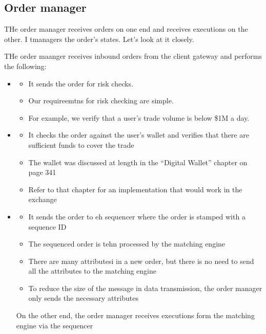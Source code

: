 \documentclass{report}
\theoremstyle{definition}
\let\oldsubsection\subsection
\renewcommand{\subsection}{\oldsubsection*}
\begin{document}
\subsection{Order manager}

THe order manager receives orders on one end and receives executions on the other. I tmanagers the order's states. Let's look at it closely.

THe order maanger receives inbound orders from the client gateway and performs the following:

\begin{itemize}
\item

\begin{itemize}
\item
It sends the order for risk checks.
\item
Our requireemtns for risk checking are simple.
\item
For example, we verify that a user's trade volume is below \$1M a day.
\end{itemize}
\item

\begin{itemize}
\item
It checks the order against the user's wallet and verifies that there are sufficient funds to cover the trade
\item
The wallet was discussed at length in the ``Digital Wallet'' chapter on page 341
\item
Refer to that chapter for an implementation that would work in the exchange
\end{itemize}
\item

\begin{itemize}
\item
It sends the order to eh sequencer where the order is stamped with a sequence ID
\item
The sequenced order is tehn processed by the matching engine
\item
There are many attributesi in a new order, but there is no need to send all the attributes to the matching engine
\item
To reduce the size of the message in data transmission, the order manager only sends the necessary attributes
\end{itemize}

On the other end, the order manager receives executions form the matching engine via the sequencer


\end{itemize}
\end{document}
